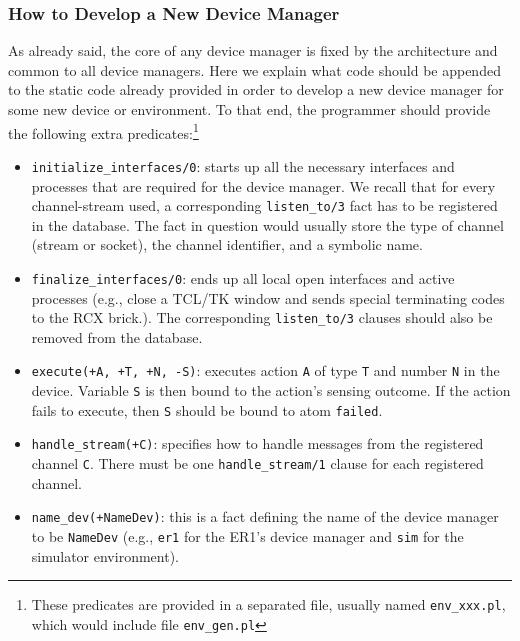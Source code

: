 \documentclass[11pt]{article}
\begin{document}
\subsubsection{How to Develop a New Device Manager}

As already said, the core of any device manager is fixed by the architecture and
common to all device managers. 
%
Here we explain what code should be appended to the static code already
provided in order to develop a new device manager for some new device or
environment. To that end, the programmer should provide the following extra
predicates:\footnote{These predicates are provided in a separated file,
  usually named \texttt{env\_xxx.pl}, which would include file
  \texttt{env\_gen.pl}}

\begin{itemize}
\item \texttt{initialize\_interfaces/0}: starts up all the necessary interfaces
  and processes that are required for the device manager. We recall that for 
  every channel-stream used, a corresponding \texttt{listen\_to/3} fact has
  to be registered in the database. The fact in question would usually store the
  type of channel (stream or socket), the channel identifier, and a
  symbolic name.
  
\item \texttt{finalize\_interfaces/0}: ends up all local open interfaces and
active processes (e.g., close a TCL/TK window and sends special
  terminating codes to the RCX brick.). The corresponding \texttt{listen\_to/3}
clauses should also be removed from the database.
  
\item \texttt{execute(+A, +T, +N, -S)}: executes action \texttt{A} of type
  \texttt{T} and number \texttt{N} in the device. Variable \texttt{S} is
  then bound to the action's sensing outcome. If the action fails to execute,
  then \texttt{S} should be bound to atom \texttt{failed}.
  
\item \texttt{handle\_stream(+C)}: specifies how to handle messages from the
  registered channel \texttt{C}. There must be one \texttt{handle\_stream/1}
  clause for each registered channel.
  
\item \texttt{name\_dev(+NameDev)}: this is a fact defining the name of the
device manager to be \texttt{NameDev} (e.g., \texttt{er1} for the ER1's device
manager and \texttt{sim} for the simulator environment).
\end{itemize}
\end{document}
